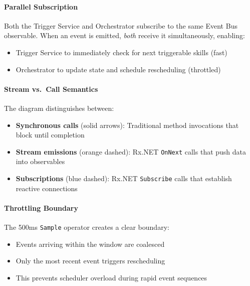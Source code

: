 \paragraph{Parallel Subscription}
Both the Trigger Service and Orchestrator subscribe to the same Event Bus observable.
When an event is emitted, \emph{both} receive it simultaneously, enabling:
\begin{itemize}
    \item Trigger Service to immediately check for next triggerable skills (fast)
    \item Orchestrator to update state and schedule rescheduling (throttled)
\end{itemize}

\paragraph{Stream vs.\ Call Semantics}
The diagram distinguishes between:
\begin{itemize}
    \item \textbf{Synchronous calls} (solid arrows): Traditional method invocations that block until completion
    \item \textbf{Stream emissions} (orange dashed): Rx.NET \texttt{OnNext} calls that push data into observables
    \item \textbf{Subscriptions} (blue dashed): Rx.NET \texttt{Subscribe} calls that establish reactive connections
\end{itemize}

\paragraph{Throttling Boundary}
The 500ms \texttt{Sample} operator creates a clear boundary:
\begin{itemize}
    \item Events arriving within the window are coalesced
    \item Only the most recent event triggers rescheduling
    \item This prevents scheduler overload during rapid event sequences
\end{itemize}
